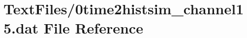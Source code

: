 \hypertarget{0time2histsim__channel15_8dat}{}\section{Text\+Files/0time2histsim\+\_\+channel15.dat File Reference}
\label{0time2histsim__channel15_8dat}
